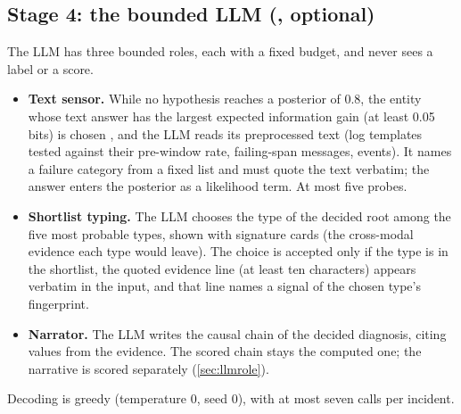 \subsection{Stage 4: the bounded LLM (, optional)}\label{sec:llm}
The LLM has three bounded roles, each with a fixed budget, and never sees a label or a score.
\begin{itemize}
\item \textbf{Text sensor.} While no hypothesis reaches a posterior of 0.8, the entity whose text answer has the largest expected
information gain (at least 0.05 bits) is chosen \citep{lindley1956information,rish2005adaptive}, and the LLM reads its
preprocessed text (log templates tested against their pre-window rate, failing-span messages, events). It names a failure category
from a fixed list and must quote the text verbatim; the answer enters the posterior as a likelihood term. At most five probes.
\item \textbf{Shortlist typing.} The LLM chooses the type of the decided root among the five most probable types, shown with
signature cards (the cross-modal evidence each type would leave). The choice is accepted only if the type is in the shortlist, the
quoted evidence line (at least ten characters) appears verbatim in the input, and that line names a signal of the chosen type's
fingerprint.
\item \textbf{Narrator.} The LLM writes the causal chain of the decided diagnosis, citing values from the evidence. The scored chain
stays the computed one; the narrative is scored separately (\cref{sec:llmrole}).
\end{itemize}
Decoding is greedy (temperature 0, seed 0), with at most seven calls per incident.
